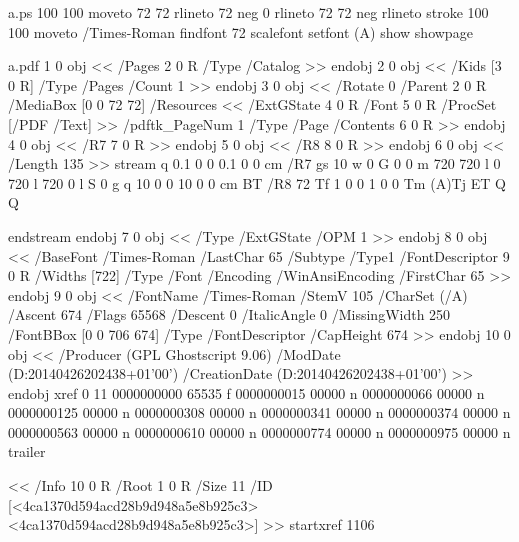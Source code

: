 
\begin{filecontents*}{a.ps}
100 100 moveto
72 72 rlineto
72 neg 0 rlineto
72 72 neg rlineto
stroke
100 100 moveto
/Times-Roman findfont
72 scalefont
setfont
(A) show
showpage
\end{filecontents*}
\begin{filecontents*}{a.pdf}
1 0  obj
<<
/Pages 2 0 R
/Type /Catalog
>>
 endobj
2 0  obj
<<
/Kids [3 0 R]
/Type /Pages
/Count 1
>>
 endobj
3 0  obj
<<
/Rotate 0
/Parent 2 0 R
/MediaBox [0 0 72 72]
 /Resources
<<
/ExtGState 4 0 R
/Font 5 0 R
/ProcSet [/PDF /Text]
>>
/pdftk_PageNum 1
/Type /Page
/Contents 6 0 R
>>
 endobj
4 0  obj
<<
/R7 7 0 R
>>
 endobj
5 0  obj
<<
/R8 8 0 R
>>
 endobj
6 0  obj
<<
/Length 135
>>
stream
q 0.1 0 0 0.1 0 0 cm
/R7 gs
10 w
0 G
0 0 m
720 720 l
0 720 l
720 0 l
S
0 g
q
10 0 0 10 0 0 cm BT
/R8 72 Tf
1 0 0 1 0 0 Tm
(A)Tj
ET
Q
Q

 endstream
 endobj
7 0  obj
<<
/Type /ExtGState
/OPM 1
>>
 endobj
8 0  obj
<<
/BaseFont /Times-Roman
/LastChar 65
/Subtype /Type1
/FontDescriptor 9 0 R
/Widths [722]
/Type /Font
/Encoding /WinAnsiEncoding
/FirstChar 65
>>
 endobj
9 0  obj
<<
/FontName /Times-Roman
/StemV 105
/CharSet (/A)
/Ascent 674
/Flags 65568
/Descent 0
/ItalicAngle 0
/MissingWidth 250
/FontBBox [0 0 706 674]
/Type /FontDescriptor
/CapHeight 674
>>
 endobj
10 0  obj
<<
/Producer (GPL Ghostscript 9.06)
/ModDate (D:20140426202438+01'00')
/CreationDate (D:20140426202438+01'00')
>>
endobj xref
0 11
0000000000 65535  f
0000000015 00000  n
0000000066 00000  n
0000000125 00000  n
0000000308 00000  n
0000000341 00000  n
0000000374 00000  n
0000000563 00000  n
0000000610 00000  n
0000000774 00000  n
0000000975 00000  n
trailer

<<
/Info 10 0 R
/Root 1 0 R
/Size 11
/ID [<4ca1370d594acd28b9d948a5e8b925c3> <4ca1370d594acd28b9d948a5e8b925c3>]
>>
startxref
1106
\end{filecontents*}
\documentclass{ltxguide}

\usepackage{color,graphicx,shortvrb}


